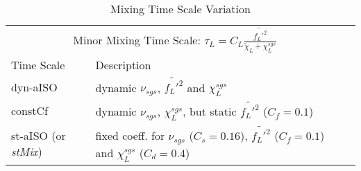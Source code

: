 \begin{table}[hbt]
    \caption{Mixing Time Scale Variation}
    \centering
    \begin{tabular}{llr}
        \toprule
        \multicolumn{2}{c}{Minor Mixing Time Scale: $\tau_L = C_{L} \frac{\widetilde{f_L'^2} }{\tilde{\chi}_L + \chi^{sgs}_L}$} \\
        \cmidrule(r){1-2}
        Time Scale & Description \\
        \midrule
        dyn-aISO & dynamic $\nu_{sgs}$, $\widetilde{f_L'^2}$ and $\chi^{sgs}_L$ \\
        constCf & dynamic $\nu_{sgs}$, $\chi^{sgs}_L$, but static $\widetilde{f_L'^2}$ ($C_f=0.1$) \\
        st-aISO (or \textit{stMix}) & fixed coeff. for $\nu_{sgs}$ ($C_s=0.16$), $\widetilde{f_L'^2}$ ($C_f=0.1$) and $\chi^{sgs}_L$ ($C_d=0.4$) \\
        \bottomrule
    \end{tabular}
    \label{tab:label}
\end{table}